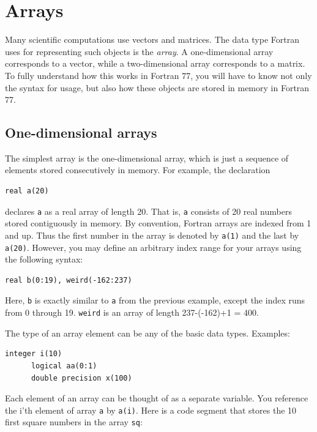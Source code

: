 \chapter{Arrays}

Many scientific computations use vectors and matrices. The data type Fortran uses for representing such objects is the \emph{array}. A one-dimensional array corresponds to a vector, while a two-dimensional array corresponds to a matrix. To fully understand how this works in Fortran 77, you will have to know not only the syntax for usage, but also how these objects are stored in memory in Fortran 77.

\section{One-dimensional arrays}

The simplest array is the one-dimensional array, which is just a sequence of elements stored consecutively in memory. For example, the declaration

\begin{lstlisting}[style=fortran77]
      real a(20)
\end{lstlisting}

declares \texttt{a} as a real array of length 20. That is, \texttt{a} consists of 20 real numbers stored contiguously in memory. By convention, Fortran arrays are indexed from 1 and up. Thus the first number in the array is denoted by \texttt{a(1)} and the last by \texttt{a(20)}. However, you may define an arbitrary index range for your arrays using the following syntax:

\begin{lstlisting}[style=fortran77]
      real b(0:19), weird(-162:237)
\end{lstlisting}

Here, \texttt{b} is exactly similar to \texttt{a} from the previous example, except the index runs from 0 through 19. \texttt{weird} is an array of length 237-(-162)+1 = 400.

The type of an array element can be any of the basic data types. Examples:

\begin{lstlisting}[style=fortran77]
      integer i(10)
      logical aa(0:1)
      double precision x(100)
\end{lstlisting}

Each element of an array can be thought of as a separate variable. You reference the i'th element of array \texttt{a} by \texttt{a(i)}. Here is a code segment that stores the 10 first square numbers in the array \texttt{sq}:

